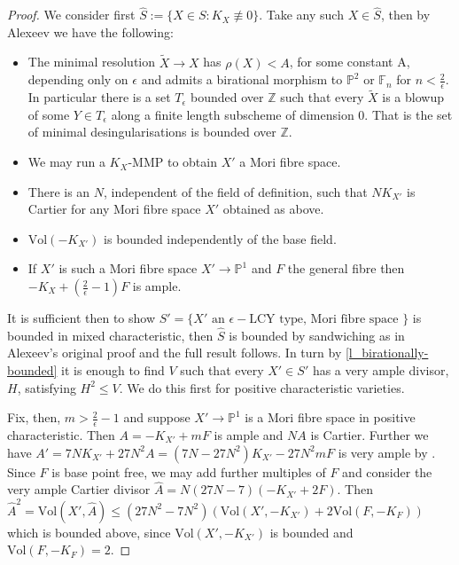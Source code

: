 \documentclass[a4paper,12pt]{book}
\newcommand{\Vol}{\text{Vol}}
\begin{document}
	\begin{proof}
		We consider first $\hat{S}:=\{X \in S\colon  K_{X} \not\equiv 0\}$. Take any such $X \in \hat{S}$, then by Alexeev \cite[Chapter 6]{alexeev1994boundedness} we have the following:
		\begin{itemize}
			\item The minimal resolution $\tilde{X}\to X$ has $\rho(X) < A $, for some constant A, depending only on $\epsilon$ and admits a birational morphism to $\mathbb{P}^{2}$ or $\mathbb{F}_{n}$ for $n < \frac{2}{\epsilon}$. In particular there is a set $T_{\epsilon}$ bounded over $\mathbb{Z}$ such that every $\tilde{X}$ is a blowup of some $Y \in T_{\epsilon}$ along a finite length subscheme of dimension $0$. That is the set of minimal desingularisations is bounded over $\mathbb{Z}$.
			\item We may run a $K_{X}$-MMP to obtain $X'$ a Mori fibre space. 
			\item There is an $N$, independent of the field of definition, such that $NK_{X'}$ is Cartier for any Mori fibre space $X'$ obtained as above.
			\item $\Vol(-K_{X'})$ is bounded independently of the base field.
			\item If $X'$ is such a Mori fibre space $X' \to \mathbb{P}^{1}$ and $F$ the general fibre then $-K_{X} +(\frac{2}{\epsilon}-1)F$ is ample.
		\end{itemize}
		
		It is sufficient then to show $S'=\{X' \text{ an } \epsilon-\text{LCY type, Mori fibre space }\}$ is bounded in mixed characteristic, then $\hat{S}$ is bounded by sandwiching as in Alexeev's original proof and the full result follows. In turn by \autoref{l_birationally-bounded} it is enough to find $V$ such that every $X' \in S'$ has a very ample divisor, $H$, satisfying $H^{2}\leq V$. We do this first for positive characteristic varieties.
		
		Fix, then, $m > \frac{2}{\epsilon}-1$ and suppose $X'\to \mathbb{P}^{1}$ is a Mori fibre space in positive characteristic. Then $A=-K_{X'} +mF$ is ample and $NA$ is Cartier. Further we have $A'=7NK_{X'}+27N^{2}A=(7N-27N^{2})K_{X'}-27N^{2}mF$ is very ample by \cite[Theorem 4.1]{witaszek2015effective}. Since $F$ is base point free, we may add further multiples of $F$ and consider the very ample Cartier divisor $\hat{A}=N(27N-7)(-K_{X'}+2F)$. Then $\hat{A}^{2}=\Vol(X',\hat{A})\leq (27N^{2}-7N^{2})(\Vol(X',-K_{X'})+2\Vol(F,-K_{F}))$ which is bounded above, since $\Vol(X',-K_{X'})$ is bounded and $\Vol(F,-K_{F})=2$. 
		

\end{proof}
\end{document}
